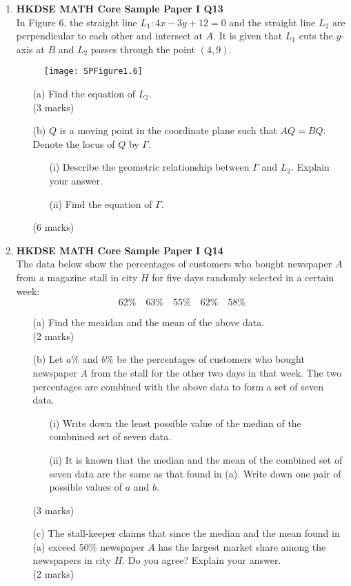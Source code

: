 \documentclass[12pt]{article}
\begin{document}
\begin{enumerate}
	\item \textbf{HKDSE MATH Core Sample Paper I Q13}\\
	In Figure 6, the straight line $L_1:4x-3y+12=0$ and the straight line $L_2$ are perpendicular to each other and intersect at $A$. It is given that $L_1$ cuts the $y$-axis at $B$ and $L_2$ passes through the point $(4,9)$.
	\begin{figure}[H]
		\centering
		\texttt{[image: SPFigure1.6]}
	\end{figure}
	\begin{enumerate}
		\item[(a)] Find the equation of $L_2$. \\(3 marks)
		\item[(b)] $Q$ is a moving point in the coordinate plane such that $AQ = BQ$. Denote the locus of $Q$ by $\Gamma$.
		\begin{enumerate}
			\item[(i)] Describe the geometric relationship between $\Gamma$ and $L_2$. Explain your answer.
			\item[(ii)] Find the equation of $\Gamma$.
		\end{enumerate}
		(6 marks)
	\end{enumerate}

	\item \textbf{HKDSE MATH Core Sample Paper I Q14}\\
	The data below show the percentages of customers who bought newspaper $A$ from a magazine stall in city $H$ for five days randomly selected in a certain week:
	$$62\% \quad 63\% \quad 55\% \quad 62\% \quad 58\%$$
	\begin{enumerate}
		\item[(a)] Find the meaidan and the mean of the above data. \\(2 marks)
		\item[(b)] Let $a\%$ and $b\%$ be the percentages of customers who bought newspaper $A$ from the stall for the other two days in that week. The two percentages are combined with the above data to form a set of seven data.
		\begin{enumerate}
			\item[(i)] Write down the least possible value of the median of the combnined set of seven data.
			\item[(ii)] It is known that the median and the mean of the combined set of seven data are the same as that found in (a). Write down one pair of possible values of $a$ and $b$.
		\end{enumerate}
		(3 marks)
		\item[(c)] The stall-keeper claims that since the median and the mean found in (a) exceed 50\% newspaper $A$ has the largest market share among the newspapers in city $H$. Do you agree? Explain your answer. \\(2 marks) 
	\end{enumerate}


\end{enumerate}
\end{document}
